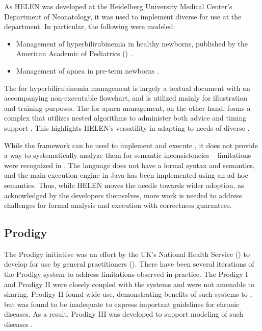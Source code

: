 As HELEN was developed at the Heidelberg University Medical Center's Department
of Neonatology, it was used to implement diverse \BPGs{} for use at the
department. In particular, the following \BPGs{} were modeled:
\begin{itemize}
  \item Management of hyperbilirubinemia in healthy newborns, published by the
    American Academic of Pediatrics (\AAP{}) \cite{HyperbilirubinemiaAAP94}.
  \item Management of apnea in pre-term newborns \cite{BhatiaCP00}.
\end{itemize}
The \BPG{} for hyperbilirubinemia management is largely a textual document
with an accompanying non-executable flowchart, and is utilized mainly for
illustration and training purposes. The \BPG{} for apnea management, on the
other hand, forms a complex \CDSSs{} that utilizes nested algorithms to
administer both advice and timing support \cite{SkonetzkiMIM04}. This highlights
HELEN's versatility in adapting to needs of diverse \BPGs{}.

While the framework can be used to implement and execute \BPGs{}, it does not
provide a way to systematically analyze them for semantic inconsistencies --
limitations were recognized in \cite{SkonetzkiMIM04}. The language does not
have a formal syntax and semantics, and the main execution engine in Java
has been implemented using an ad-hoc semantics. Thus, while HELEN moves the
needle towards wider \BPG{} adoption, as acknowledged by the developers themselves,
more work is needed to address challenges for formal analysis and execution with
correctness guarantees.

\subsection{Prodigy}\label{sec:prodigy}

The Prodigy initiative was an effort by the UK's National Health Service
(\NHS{}) to develop \CDSSs{} for use by general practitioners (\GPs{}). There have
been several iterations of the Prodigy system to address limitations
observed in practice. The Prodigy I and Prodigy II were closely coupled with
the \EHR{} systems and were not amenable to sharing. Prodigy II found wide
use, demonstrating benefits of such systems to \GPs{}, but was found to be
inadequate to express important guidelines for chronic diseases. As a result,
Prodigy III was developed to support modeling of such diseases \cite{JohnsonAMIA00}.

